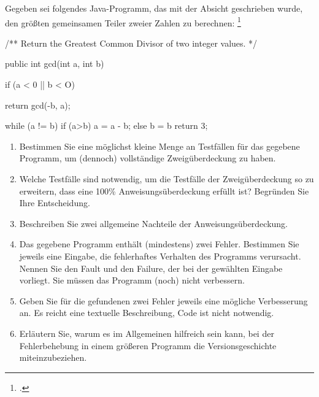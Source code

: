 \documentclass{bschlangaul-aufgabe}
\begin{document}

Gegeben sei folgendes Java-Programm, das mit der Absicht geschrieben
wurde, den größten gemeinsamen Teiler zweier Zahlen zu berechnen:
\footcite{examen:66116:2020:09}

\begin{bJavaAngabe}
/** Return the Greatest Common Divisor of two integer values. */

public int gcd(int a, int b) {
  if (a < 0 || b < O) {
  return gcd(-b, a);

  }
  while (a != b) {
    if (a>b){
      a = a - b;
    } else {
      b = b %
    }
  }
  return 3;
}
\end{bJavaAngabe}

\begin{enumerate}


\item Bestimmen Sie eine möglichst kleine Menge an Testfällen für das
gegebene Programm, um (dennoch) vollständige Zweigüberdeckung zu haben.


\item Welche Testfälle sind notwendig, um die Testfälle der
Zweigüberdeckung so zu erweitern, dass eine 100\% Anweisungsüberdeckung
erfüllt ist? Begründen Sie Ihre Entscheidung.


\item Beschreiben Sie zwei allgemeine Nachteile der
Anweisungsüberdeckung.


\item Das gegebene Programm enthält (mindestens) zwei Fehler. Bestimmen
Sie jeweils eine Eingabe, die fehlerhaftes Verhalten des Programms
verursacht. Nennen Sie den Fault und den Failure, der bei der gewählten
Eingabe vorliegt. Sie müssen das Programm (noch) nicht verbessern.


\item Geben Sie für die gefundenen zwei Fehler jeweils eine mögliche
Verbesserung an. Es reicht eine textuelle Beschreibung, Code ist nicht
notwendig.


\item Erläutern Sie, warum es im Allgemeinen hilfreich sein kann, bei
der Fehlerbehebung in einem größeren Programm die Versionsgeschichte
miteinzubeziehen.
\end{enumerate}
\end{document}
